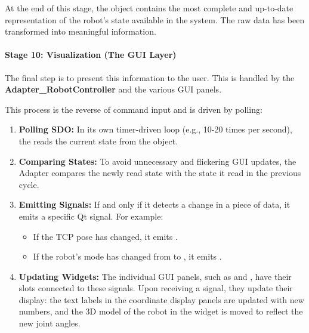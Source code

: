 At the end of this stage, the  object contains the most complete and up-to-date representation of the robot's state available in the system. The raw data has been transformed into meaningful information.

\paragraph{Stage 10: Visualization (The GUI Layer)}
The final step is to present this information to the user. This is handled by the \textbf{Adapter\_RobotController} and the various GUI panels.

This process is the reverse of command input and is driven by polling:
\begin{enumerate}
    \item \textbf{Polling SDO:} In its own timer-driven loop (e.g., 10-20 times per second), the  reads the current state from the  object.
    
    \item \textbf{Comparing States:} To avoid unnecessary and flickering GUI updates, the Adapter compares the newly read state with the state it read in the previous cycle.
    
    \item \textbf{Emitting Signals:} If and only if it detects a change in a piece of data, it emits a specific Qt signal. For example:
    \begin{itemize}
        \item If the TCP pose has changed, it emits .
        \item If the robot's mode has changed from  to , it emits .
    \end{itemize}
    
    \item \textbf{Updating Widgets:} The individual GUI panels, such as  and , have their slots connected to these signals. Upon receiving a signal, they update their display: the text labels in the coordinate display panels are updated with new numbers, and the 3D model of the robot in the  widget is moved to reflect the new joint angles.
\end{enumerate}

